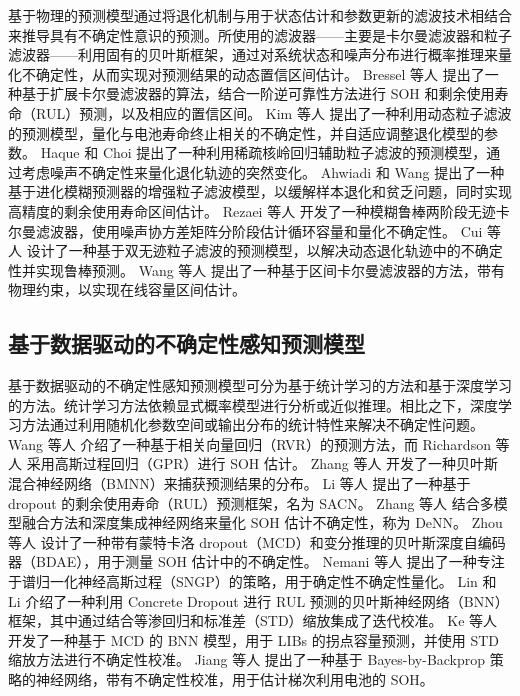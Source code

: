 \documentclass[UTF8,journal,twoside,web]{ieeecolor}
\begin{document}
基于物理的预测模型通过将退化机制与用于状态估计和参数更新的滤波技术相结合来推导具有不确定性意识的预测。所使用的滤波器——主要是卡尔曼滤波器和粒子滤波器——利用固有的贝叶斯框架，通过对系统状态和噪声分布进行概率推理来量化不确定性\cite{chen2003bayesian}，从而实现对预测结果的动态置信区间估计。
Bressel 等人\cite{7386653} 提出了一种基于扩展卡尔曼滤波器的算法，结合一阶逆可靠性方法进行 SOH 和剩余使用寿命（RUL）预测，以及相应的置信区间。
Kim 等人\cite{9032349} 提出了一种利用动态粒子滤波的预测模型，量化与电池寿命终止相关的不确定性，并自适应调整退化模型的参数。
Haque 和 Choi\cite{9113648} 提出了一种利用稀疏核岭回归辅助粒子滤波的预测模型，通过考虑噪声不确定性来量化退化轨迹的突然变化。
Ahwiadi 和 Wang\cite{AHWIADI2022110817} 提出了一种基于进化模糊预测器的增强粒子滤波模型，以缓解样本退化和贫乏问题，同时实现高精度的剩余使用寿命区间估计。
Rezaei 等人\cite{REZAEI2023107883} 开发了一种模糊鲁棒两阶段无迹卡尔曼滤波器，使用噪声协方差矩阵分阶段估计循环容量和量化不确定性。
Cui 等人\cite{10385053} 设计了一种基于双无迹粒子滤波的预测模型，以解决动态退化轨迹中的不确定性并实现鲁棒预测。
Wang 等人\cite{10672556} 提出了一种基于区间卡尔曼滤波器的方法，带有物理约束，以实现在线容量区间估计。


\subsection{基于数据驱动的不确定性感知预测模型}\label{subsec:data-driven_models}

基于数据驱动的不确定性感知预测模型可分为基于统计学习的方法\cite{van2021bayesian, gruber2025sourcesuncertaintysupervisedmachine}和基于深度学习的方法\cite{ABDAR2021243}。统计学习方法依赖显式概率模型进行分析或近似推理。相比之下，深度学习方法通过利用随机化参数空间或输出分布的统计特性来解决不确定性问题。
% 
Wang 等人\cite{rvr_rul_9552552} 介绍了一种基于相关向量回归（RVR）的预测方法，而
Richardson 等人\cite{gpr_soh_8263147} 采用高斯过程回归（GPR）进行 SOH 估计。
% 
Zhang 等人\cite{bbb_rul_9738999} 开发了一种贝叶斯混合神经网络（BMNN）来捕获预测结果的分布。
%
Li 等人\cite{capsnet_rul_li2024sensor} 提出了一种基于 dropout 的剩余使用寿命（RUL）预测框架，名为 SACN。
%
Zhang 等人\cite{ensemble2_soh_10102497} 结合多模型融合方法和深度集成神经网络来量化 SOH 估计不确定性，称为 DeNN。
%
Zhou 等人\cite{mcdropout_autoencoder_10412192} 设计了一种带有蒙特卡洛 dropout（MCD）和变分推理的贝叶斯深度自编码器（BDAE），用于测量 SOH 估计中的不确定性。
%
Nemani 等人\cite{nemani2023uncertainty} 提出了一种专注于谱归一化神经高斯过程（SNGP）的策略，用于确定性不确定性量化。
%
Lin 和 Li\cite{9729404} 介绍了一种利用 Concrete Dropout 进行 RUL 预测的贝叶斯神经网络（BNN）框架，其中通过结合等渗回归和标准差（STD）缩放集成了迭代校准。
%
Ke 等人\cite{10217044} 开发了一种基于 MCD 的 BNN 模型，用于 LIBs 的拐点容量预测，并使用 STD 缩放方法进行不确定性校准。
%
Jiang 等人\cite{10391265} 提出了一种基于 Bayes-by-Backprop 策略的神经网络，带有不确定性校准，用于估计梯次利用电池的 SOH。
\end{document}
